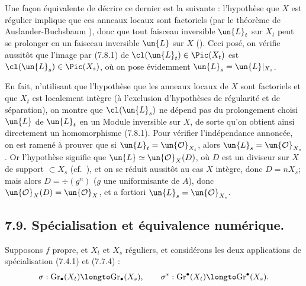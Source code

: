 Une fa\c con \'equivalente de d\'ecrire ce dernier est la suivante : l'hypoth\`ese que $X$ est r\'egulier implique que ces anneaux locaux sont factoriels (par le th\'eor\`eme de Auslander-Buchsbaum ), donc que tout faisceau inversible $\un{L}_{t}$ sur $X_{t}$ peut se prolonger en un faisceau inversible $\un{L}$ sur $X$ (). Ceci pos\'e, on v\'erifie aussit\^ot que l'image par (7.8.1) de $\cl(\un{L}_{t}) \in \Pic(X_{t})$ est $\cl(\un{L}_{s}) \in \Pic(X_{s})$, o\`u on pose \'evidemment $\un{L}_{s} = \un{L}|_{X_{s}}$.

En fait, n'utilisant que l'hypoth\`ese que les anneaux locaux de $X$ sont factoriels et que $X_{t}$ est localement int\`egre (\`a l'exclusion d'hypoth\`eses de r\'egularit\'e et de s\'eparation), on montre que $\cl(\un{L}_{s})$ ne d\'epend pas du prolongement choisi $\un{L}$ de $\un{L}_{t}$ en un Module inversible sur $X$, de sorte qu'on obtient ainsi directement un homomorphisme (7.8.1). Pour v\'erifier l'ind\'ependance annonc\'ee, on est ramen\'e \`a prouver que si $\un{L}_{t} = \un{\mathcal{O}}_{X_{t}}$, alors $\un{L}_{s} = \un{\mathcal{O}}_{X_{s}}$. Or l'hypoth\`ese signifie que $\un{L} \simeq \un{\mathcal{O}}_{X}(D)$, o\`u $D$ est un diviseur sur $X$ de support $\subset X_{s}$ (cf.\ ), et on se r\'eduit aussit\^ot au cas $X$ int\`egre, donc $D = nX_{s}$; mais alors $D = \div(g^{n})$ ($g$ une uniformisante de $A$), donc $\un{\mathcal{O}}_{X}(D) = \un{\mathcal{O}}_{X}$, et a fortiori $\un{L}_{s} = \un{\mathcal{O}}_{X_{s}}$.

\subsection*{7.9. Sp\'ecialisation et \'equivalence num\'erique.}

Supposons $f$ propre, et $X_{t}$ et $X_{s}$ r\'eguliers, et consid\'erons les deux applications de sp\'ecialisation (7.4.1) et (7.7.4) :
\begin{equation}\label{eq:7.9.1}
\sigma : \mathrm{Gr}_{\bullet}(X_{t}) \longto \mathrm{Gr}_{\bullet}(X_{s}), \qquad \sigma^{*} : \mathrm{Gr}^{\bullet}(X_{t}) \longto \mathrm{Gr}^{\bullet}(X_{s}).
\end{equation}

